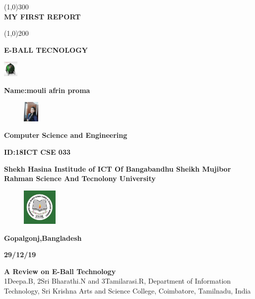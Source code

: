 \documentclass{article}
\begin{document}
\begin{titlepage}
\begin{center}
\line(1,0){300}\\
\huge{\bfseries MY FIRST REPORT }

\line(1,0){200}

 \end{center}
 \begin {center}
\textbf{E-BALL TECNOLOGY}
\begin{figure}[h]
\end{figure}
\end{center}
\centering
\includegraphics[height=0.3in]{index13.jpg}


    \begin{center}
        \vspace*{1cm}
       \textbf{Name:mouli afrin proma}
       
\begin{figure}[h]
\centering
\includegraphics[height=0.4in]{e-ball.jpg}

\end{figure}
 
        \Large
        \begin{flushleft}
        
         \textbf{  Computer Science and Engineering}
        \end{flushleft}
        
     
      
      \textbf{ID:18ICT CSE 033}
      
      \begin{flushleft}
             \textbf{ Shekh Hasina Institude of ICT Of Bangabandhu Sheikh Mujibor Rahman Science And Tecnolony University}
             \begin{figure}[h]
\centering
\includegraphics[height=0.7in]{bsmrstu.jpg}

\end{figure}
         
      \end{flushleft}

       \textbf{Gopalgonj,Bangladesh }
       
       
       \textbf{29/12/19}
 
 
    
    \end{center}
\end{titlepage}
\tableofcontents
\thispagestyle{empty}
\newpage
\textbf{A Review on E-Ball Technology}\\ 
1Deepa.B, 2Sri Bharathi.N and 3Tamilarasi.R, Department of Information Technology, Sri Krishna Arts and Science College, Coimbatore, Tamilnadu, India 
 
\end{document}
